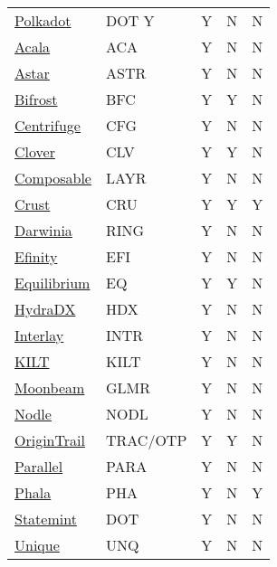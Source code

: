 \documentclass[11pt]{article}
\def \doturl{https://research.web3.foundation/en/latest/polkadot/overview/2-token-economics.html}
\def \acaurl{https://github.com/AcalaNetwork/Acala-white-paper/}
\def \astrurl{https://docs.astar.network/docs/about/token-economics/inflationary-model/}
\def \bfcurl{https://docs.thebifrost.io/bifrost-network/}
\def \cfgurl{https://docs.centrifuge.io/}
\def \clvurl{https://docs.clv.org/use-clv-chain/economics/tokenomics}
\def \layrurl{https://docs.composable.finance/parachains/composable/LAYR-tokenomics}
\def \cruurl{https://crustipfs.live/ipfs/QmXUhqUgZGVJsWmV4TCDePwWtpJvEAx7rvNCjuNKaEUHzk}
\def \ringurl{https://darwinia.network/genepaper_v2.pdf}
\def \efiurl{https://efinity.io/whitepaper/introduction}
\def \equrl{https://equilibrium.io/docs/EQ_token_economy.pdf}
\def \hdxurl{https://docs.hydradx.io/tokenomics/}
\def \intrurl{https://docs.interlay.io/\#/interlay/tokenomics/}
\def \kilturl{https://www.kilt.io/wp-content/uploads/2021/08/19_KILT_Token_Metrics_Revised_Version.pdf}
\def \glmrurl{https://moonbeam.foundation/glimmer-token/}
\def \nodlurl{https://docs.nodle.com/docs/tokenomics/introduction}
\def \tracotpurl{https://parachain.origintrail.io/whitepaper?section=trac-otp-tokenomics}
\def \paraurl{https://docs.parallel.fi/parallel-finance/parallel-finance-protocol/parallel-token-economy-paper}
\def \phaurl{https://wiki.phala.network/en-us/general/phala-network/intro/}
\def \dotsurl{https://wiki.polkadot.network/docs/learn-statemint}
\def \unqurl{https://github.com/UniqueNetwork/techpaper/blob/master/unique_techpaper.pdf}
\begin{document}
\begin{table}[!ht]
\begin{tabular}{l l c c c}
\rule{0pt}{1.5\normalbaselineskip}\href{\doturl}{Polkadot}     & DOT Y & Y & N & N \\
\href{\acaurl}{Acala}        & ACA   & Y & N & N \\
\href{\astrurl}{Astar}       & ASTR  & Y & N & N \\
\href{\bfcurl}{Bifrost}      & BFC   & Y & Y & N \\
\href{\cfgurl}{Centrifuge}   & CFG   & Y & N & N \\
\href{\clvurl}{Clover}       & CLV   & Y & Y & N \\
\href{\layrurl}{Composable}  & LAYR  & Y & N & N \\
\href{\cruurl}{Crust}        & CRU   & Y & Y & Y \\ 
\href{\ringurl}{Darwinia}    & RING  & Y & N & N \\ 
\href{\efiurl}{Efinity}      & EFI   & Y & N & N \\
\href{\equrl}{Equilibrium}   & EQ    & Y & Y & N \\
\href{\hdxurl}{HydraDX}      & HDX   & Y & N & N \\
\href{\intrurl}{Interlay}    & INTR  & Y & N & N \\
\href{\kilturl}{KILT}        & KILT  & Y & N & N \\
\href{\glmrurl}{Moonbeam}    & GLMR  & Y & N & N \\
\href{\nodlurl}{Nodle}       & NODL  & Y & N & N \\
\href{\tracotpurl}{OriginTrail} & TRAC/OTP  & Y & Y & N \\
\href{\paraurl}{Parallel}       & PARA      & Y & N & N \\
\href{\phaurl}{Phala}           & PHA       & Y & N & Y \\
\href{\dotsurl}{Statemint}      & DOT       & Y & N & N \\
\href{\unqurl}{Unique}          & UNQ       & Y & N & N \\[1.5ex]
\hline %

\end{tabular}
\end{table}

\pagebreak
\begin{refsection}
\nocite{*}
\printbibliography[heading=bibnumbered]
\end{refsection}

\appendix
\end{document}
